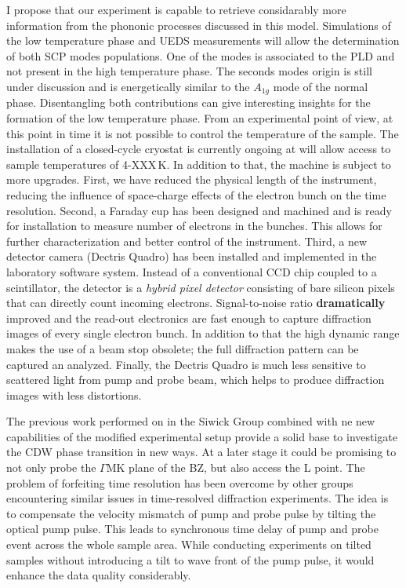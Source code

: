 I propose that our experiment is capable to retrieve considarably more information from the phononic processes discussed in this model.
Simulations of the low temperature phase and \ac{UEDS} measurements will allow the determination of both \ac{SCP} modes populations.
One of the modes is associated to the \ac{PLD} and not present in the high temperature phase.
The seconds modes origin is still under discussion and is energetically similar to the $A_{1g}$ mode of the normal phase\cite{holy1977}.
Disentangling both contributions can give interesting insights for the formation of the low temperature phase.
From an experimental point of view, at this point in time it is not possible to control the temperature of the sample.
The installation of a closed-cycle cryostat is currently ongoing at will allow access to sample temperatures of 4-XXX\,K.
In addition to that, the machine is subject to more upgrades.
First, we have reduced the physical length of the instrument, reducing the influence of space-charge effects of the electron bunch on the time resolution.
Second, a Faraday cup has been designed and machined and is ready for installation to measure number of electrons in the bunches.
This allows for further characterization and better control of the instrument.
Third, a new detector camera (Dectris Quadro) has been installed and implemented in the laboratory software system.
Instead of a conventional CCD chip coupled to a scintillator, the detector is a \emph{hybrid pixel detector} consisting of bare silicon pixels that can directly count incoming electrons.
Signal-to-noise ratio \textbf{dramatically} improved and the read-out electronics are fast enough to capture diffraction images of every single electron bunch.
In addition to that the high dynamic range makes the use of a beam stop obsolete; the full diffraction pattern can be captured an analyzed.
Finally, the Dectris Quadro is much less sensitive to scattered light from pump and probe beam, which helps to produce diffraction images with less distortions.

The previous work performed on \ts\space in the Siwick Group combined with ne new capabilities of the modified experimental setup provide a solid base to investigate the \ac{CDW} phase transition in new ways.
At a later stage it could be promising to not only probe the $\Gamma\mathrm{MK}$ plane of the \ac{BZ}, but also access the L point.
The problem of forfeiting time resolution has been overcome by other groups encountering similar issues in time-resolved diffraction experiments.
The idea is to compensate the velocity mismatch of pump and probe pulse by tilting the optical pump pulse.
This leads to synchronous time delay of pump and probe event across the whole sample area\cite{baum2006,zhou2013}.
While conducting experiments on tilted samples without introducing a tilt to wave front of the pump pulse, it would enhance the data quality considerably.

